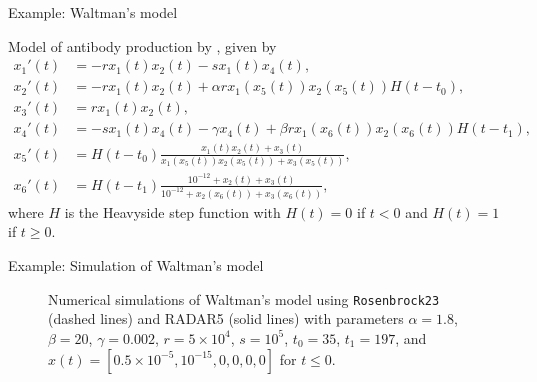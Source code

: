 \documentclass[aspectratio=169]{beamer}
\begin{document}
\begin{frame}{Example: Waltman's model}

  Model of antibody production by \textcite{waltman1978}, given by
  \begin{align*}
    x_1'(t) &= - r x_1(t) x_2(t) - s x_1(t) x_4(t), \\
    x_2'(t) &= - r x_1(t) x_2(t) + \alpha r x_1(x_5(t)) x_2(x_5(t)) H(t - t_0), \\
    x_3'(t) &= r x_1(t) x_2(t), \\
    x_4'(t) &= - s x_1(t) x_4(t) - \gamma x_4(t) + \beta r x_1(x_6(t)) x_2(x_6(t)) H(t - t_1), \\
    x_5'(t) &= H(t - t_0) \frac{x_1(t) x_2(t) + x_3(t)}{x_1(x_5(t)) x_2(x_5(t)) + x_3(x_5(t))}, \\
    x_6'(t) &= H(t - t_1) \frac{10^{-12} + x_2(t) + x_3(t)}{10^{-12} + x_2(x_6(t)) + x_3(x_6(t))},
  \end{align*}
  where $H$ is the Heavyside step function with $H(t) = 0$ if $t < 0$ and $H(t) = 1$ if $t \geq 0$.
\end{frame}

\begin{frame}{Example: Simulation of Waltman's model}
  \begin{figure}[htbp]
    \begin{center}
      
      \caption{\label{fig:waltman}Numerical simulations of Waltman's model using \texttt{Rosenbrock23} (dashed lines) and RADAR5 (solid lines) with parameters $\alpha = 1.8$, $\beta = 20$, $\gamma = 0.002$, $r = 5 \times 10^4$, $s = 10^5$, $t_0 = 35$, $t_1 = 197$, and $x(t) = [0.5 \times 10^{-5}, 10^{-15}, 0, 0, 0, 0]$ for $t \leq 0$.}
    \end{center}
  \end{figure}
\end{frame}
\end{document}
